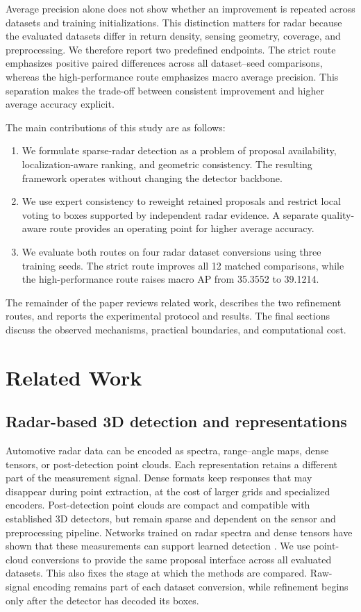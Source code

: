 \documentclass[sensors,article,submit,pdftex,moreauthors]{Definitions/mdpi}
\begin{document}
Average precision alone does not show whether an improvement is repeated
across datasets and training initializations. This distinction matters for
radar because the evaluated datasets differ in return density, sensing
geometry, coverage, and preprocessing. We therefore report two predefined
endpoints. The strict route emphasizes positive paired differences across all
dataset--seed comparisons, whereas the high-performance route emphasizes macro
average precision. This separation makes the trade-off between consistent
improvement and higher average accuracy explicit.

The main contributions of this study are as follows:
\begin{enumerate}[leftmargin=*]
\item We formulate sparse-radar detection as a problem of proposal
availability, localization-aware ranking, and geometric consistency. The
resulting framework operates without changing the detector backbone.
\item We use expert consistency to reweight retained proposals and restrict
local voting to boxes supported by independent radar evidence. A separate
quality-aware route provides an operating point for higher average accuracy.
\item We evaluate both routes on four radar dataset conversions using three
training seeds. The strict route improves all 12 matched comparisons, while
the high-performance route raises macro AP from 35.3552 to 39.1214.
\end{enumerate}

The remainder of the paper reviews related work, describes the two refinement
routes, and reports the experimental protocol and results. The final sections
discuss the observed mechanisms, practical boundaries, and computational cost.

\section{Related Work}

\subsection{Radar-based 3D detection and representations}

Automotive radar data can be encoded as spectra, range--angle maps, dense
tensors, or post-detection point clouds. Each representation retains a
different part of the measurement signal. Dense formats keep responses that
may disappear during point extraction, at the cost of larger grids and
specialized encoders. Post-detection point clouds are compact and compatible
with established 3D detectors, but remain sparse and dependent on the sensor
and preprocessing pipeline. Networks trained on radar spectra and dense tensors
have shown that these measurements can support learned detection
\cite{patel2019radarspectra,wang2021rodnet}. We use point-cloud conversions to
provide the same proposal interface across all evaluated datasets. This also
fixes the stage at which the methods are compared. Raw-signal encoding remains
part of each dataset conversion, while refinement begins only after the
detector has decoded its boxes.
\end{document}
